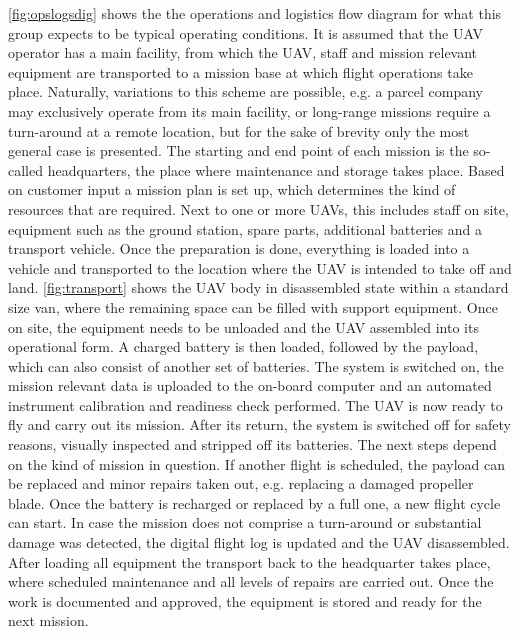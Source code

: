 \autoref{fig:opslogsdig} shows the the operations and logistics flow diagram for what this group expects to be typical operating conditions. It is assumed that the UAV operator has a main facility, from which the UAV, staff and mission relevant equipment are transported to a mission base at which flight operations take place. Naturally, variations to this scheme are possible, e.g. a parcel company may exclusively operate from its main facility, or long-range missions require a turn-around at a remote location, but for the sake of brevity only the most general case is presented.
The starting and end point of each mission is the so-called headquarters, the place where maintenance and storage takes place. Based on customer input a mission plan is set up, which determines the kind of resources that are required. Next to one or more UAVs, this includes staff on site, equipment such as the ground station, spare parts, additional batteries and a transport vehicle. Once the preparation is done, everything is loaded into a vehicle and transported to the location where the UAV is intended to take off and land. \autoref{fig:transport} shows the UAV body in disassembled state within a standard size van, where the remaining space can be filled with support equipment.
Once on site, the equipment needs to be unloaded and the UAV assembled into its operational form. A charged battery is then loaded, followed by the payload, which can also consist of another set of batteries. The system is switched on, the mission relevant data is uploaded to the on-board computer and an automated instrument calibration and readiness check performed. The UAV is now ready to fly and carry out its mission. After its return, the system is switched off for safety reasons, visually inspected and stripped off its batteries. The next steps depend on the kind of mission in question. If another flight is scheduled, the payload can be replaced and minor repairs taken out, e.g. replacing a damaged propeller blade. Once the battery is recharged or replaced by a full one, a new flight cycle can start. In case the mission does not comprise a turn-around or substantial damage was detected, the digital flight log is updated and the UAV disassembled. After loading all equipment the transport back to the headquarter takes place, where scheduled maintenance and all levels of repairs are carried out. Once the work is documented and approved, the equipment is stored and ready for the next mission.

